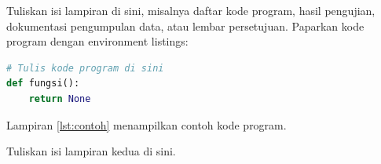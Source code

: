 %
\lampiran %


Tuliskan isi lampiran di sini, misalnya daftar kode program, hasil pengujian,
dokumentasi pengumpulan data, atau lembar persetujuan. Paparkan kode program
dengan environment listings:

\begin{lstlisting}[language=Python,caption={Contoh Kode Program},label={lst:contoh}]
# Tulis kode program di sini
def fungsi():
    return None
\end{lstlisting}

Lampiran \ref{lst:contoh} menampilkan contoh kode program.


Tuliskan isi lampiran kedua di sini.